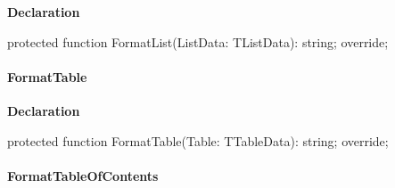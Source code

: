 \documentclass{report}
\newif\ifpdf
\begin{document}
\label{PasDoc_GenHtml.TGenericHTMLDocGenerator-FormatList}
\begin{list}{}{
\setlength{\itemindent}{0cm}
\setlength{\listparindent}{0cm}
\setlength{\leftmargin}{\evensidemargin}
\addtolength{\leftmargin}{\tmplength}
\settowidth{\labelsep}{X}
\addtolength{\leftmargin}{\labelsep}
\setlength{\labelwidth}{\tmplength}
}
\item[\textbf{Declaration}\hfill]
\ifpdf
\begin{flushleft}
\fi
\begin{ttfamily}
protected function FormatList(ListData: TListData): string; override;\end{ttfamily}

\ifpdf
\end{flushleft}
\fi

\end{list}
\paragraph*{FormatTable}\hspace*{\fill}

\label{PasDoc_GenHtml.TGenericHTMLDocGenerator-FormatTable}
\begin{list}{}{
\setlength{\itemindent}{0cm}
\setlength{\listparindent}{0cm}
\setlength{\leftmargin}{\evensidemargin}
\addtolength{\leftmargin}{\tmplength}
\settowidth{\labelsep}{X}
\addtolength{\leftmargin}{\labelsep}
\setlength{\labelwidth}{\tmplength}
}
\item[\textbf{Declaration}\hfill]
\ifpdf
\begin{flushleft}
\fi
\begin{ttfamily}
protected function FormatTable(Table: TTableData): string; override;\end{ttfamily}

\ifpdf
\end{flushleft}
\fi

\end{list}
\paragraph*{FormatTableOfContents}\hspace*{\fill}
\end{document}
